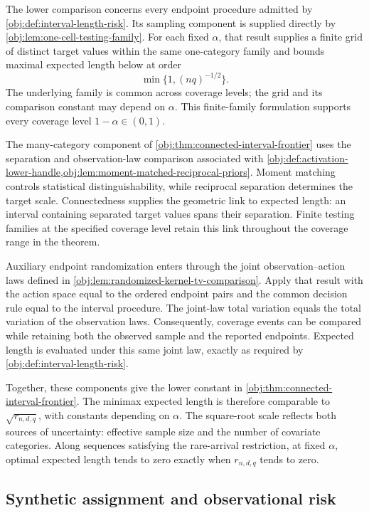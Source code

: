 \documentclass[11pt]{article}
\begin{document}
The lower comparison concerns every endpoint procedure admitted by \cref{obj:def:interval-length-risk}. Its sampling component is supplied directly by \cref{obj:lem:one-cell-testing-family}. For each fixed \(\alpha\), that result supplies a finite grid of distinct target values within the same one-category family and bounds maximal expected length below at order
\[
\min\{1,(nq)^{-1/2}\}.
\]
The underlying family is common across coverage levels; the grid and its comparison constant may depend on \(\alpha\). This finite-family formulation supports every coverage level \(1-\alpha\in(0,1)\).

The many-category component of \cref{obj:thm:connected-interval-frontier} uses the separation and observation-law comparison associated with \cref{obj:def:activation-lower-handle,obj:lem:moment-matched-reciprocal-priors}. Moment matching controls statistical distinguishability, while reciprocal separation determines the target scale. Connectedness supplies the geometric link to expected length: an interval containing separated target values spans their separation. Finite testing families at the specified coverage level retain this link throughout the coverage range in the theorem.

Auxiliary endpoint randomization enters through the joint observation--action laws defined in \cref{obj:lem:randomized-kernel-tv-comparison}. Apply that result with the action space equal to the ordered endpoint pairs and the common decision rule equal to the interval procedure. The joint-law total variation equals the total variation of the observation laws. Consequently, coverage events can be compared while retaining both the observed sample and the reported endpoints. Expected length is evaluated under this same joint law, exactly as required by \cref{obj:def:interval-length-risk}.

Together, these components give the lower constant  in \cref{obj:thm:connected-interval-frontier}. The minimax expected length  is therefore comparable to \(\sqrt{r_{n,d,q}}\), with constants depending on \(\alpha\). The square-root scale reflects both sources of uncertainty: effective sample size and the number of covariate categories. Along sequences satisfying the rare-arrival restriction, at fixed \(\alpha\), optimal expected length tends to zero exactly when \(r_{n,d,q}\) tends to zero.

\subsection{Synthetic assignment and observational risk}
\end{document}
